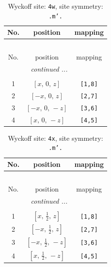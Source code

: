 \documentclass[fleqn,8pt]{jsarticle}
\begin{document}
\renewcommand{\arraystretch}{1.2}
\begin{longtable}{ccc}
\caption{Wyckoff site: {\tt 4w}, site symmetry: {\tt .m'.}}
 \\
 \hline \hline
No. & position & mapping \\ \hline \endfirsthead

\multicolumn{2}{l}{\tablename\ \thetable{}} \\
 \hline \hline
No. & position & mapping \\ \hline \endhead

 \hline \hline
\multicolumn{2}{r}{\footnotesize\it continued ...} \\ \endfoot

 \hline \hline
\multicolumn{2}{r}{} \\ \endlastfoot

1 & $\left[ x,\, 0,\, z \right]$ & {\tt [1,8]} \\ \hline
2 & $\left[ - x,\, 0,\, z \right]$ & {\tt [2,7]} \\ \hline
3 & $\left[ - x,\, 0,\, - z \right]$ & {\tt [3,6]} \\ \hline
4 & $\left[ x,\, 0,\, - z \right]$ & {\tt [4,5]} \\
\end{longtable}
\renewcommand{\arraystretch}{1.2}
\begin{longtable}{ccc}
\caption{Wyckoff site: {\tt 4x}, site symmetry: {\tt .m'.}}
 \\
 \hline \hline
No. & position & mapping \\ \hline \endfirsthead

\multicolumn{2}{l}{\tablename\ \thetable{}} \\
 \hline \hline
No. & position & mapping \\ \hline \endhead

 \hline \hline
\multicolumn{2}{r}{\footnotesize\it continued ...} \\ \endfoot

 \hline \hline
\multicolumn{2}{r}{} \\ \endlastfoot

1 & $\left[ x,\, \frac{1}{2},\, z \right]$ & {\tt [1,8]} \\ \hline
2 & $\left[ - x,\, \frac{1}{2},\, z \right]$ & {\tt [2,7]} \\ \hline
3 & $\left[ - x,\, \frac{1}{2},\, - z \right]$ & {\tt [3,6]} \\ \hline
4 & $\left[ x,\, \frac{1}{2},\, - z \right]$ & {\tt [4,5]} \\
\end{longtable}
\end{document}
